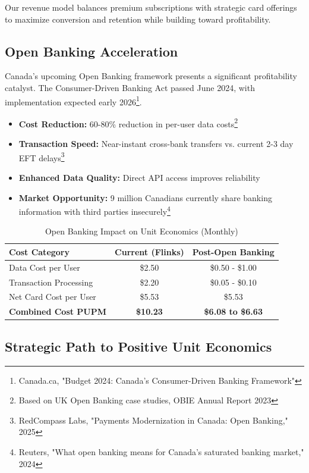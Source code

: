 \documentclass[11pt,letterpaper]{article}
\begin{document}
Our revenue model balances premium subscriptions with strategic card offerings to maximize conversion and retention while building toward profitability.

\subsection{Open Banking Acceleration}

Canada's upcoming Open Banking framework presents a significant profitability catalyst. The Consumer-Driven Banking Act passed June 2024, with implementation expected early 2026\footnote{Canada.ca, "Budget 2024: Canada's Consumer-Driven Banking Framework"}.

\begin{itemize}
\item \textbf{Cost Reduction:} 60-80\% reduction in per-user data costs\footnote{Based on UK Open Banking case studies, OBIE Annual Report 2023}
\item \textbf{Transaction Speed:} Near-instant cross-bank transfers vs. current 2-3 day EFT delays\footnote{RedCompass Labs, "Payments Modernization in Canada: Open Banking," 2025}
\item \textbf{Enhanced Data Quality:} Direct API access improves reliability
\item \textbf{Market Opportunity:} 9 million Canadians currently share banking information with third parties insecurely\footnote{Reuters, "What open banking means for Canada's saturated banking market," 2024}
\end{itemize}

\begin{table}[h]
\centering
\caption{Open Banking Impact on Unit Economics (Monthly)}
\renewcommand{\arraystretch}{1.3}
\begin{tabular}{|l|c|c|}
\hline
\textbf{Cost Category} & \textbf{Current (Flinks)} & \textbf{Post-Open Banking} \\
\hline
Data Cost per User & \$2.50 & \$0.50 - \$1.00 \\
Transaction Processing & \$2.20 & \$0.05 - \$0.10 \\
Net Card Cost per User & \$5.53 & \$5.53 \\
\hline
\textbf{Combined Cost PUPM} & \textbf{\$10.23} & \textbf{\$6.08 to \$6.63} \\
\hline
\end{tabular}
\end{table}

\subsection{Strategic Path to Positive Unit Economics}
\end{document}
